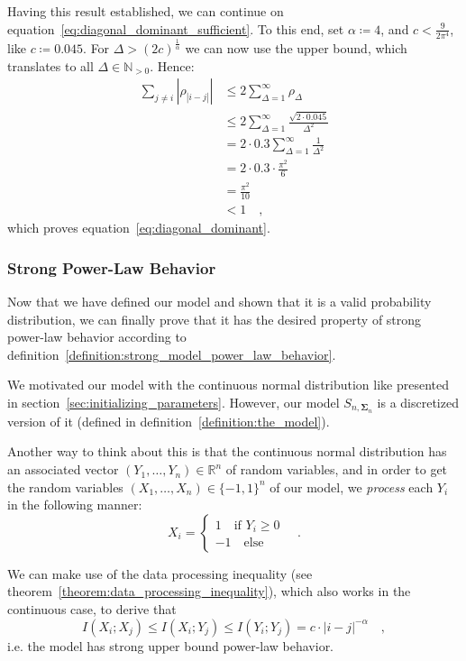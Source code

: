 \documentclass[../../main.tex]{subfiles}
\begin{document}
Having this result established, we can continue on equation~\eqref{eq:diagonal_dominant_sufficient}. To this end, set $\alpha \coloneqq 4$, and $c < \frac{9}{2 \pi^4}$, like $c \coloneqq 0.045$. For $\Delta > (2c)^{\frac{1}{\alpha}}$ we can now use the upper bound, which translates to all $\Delta \in \mathbb{N}_{>0}$. Hence:
\begin{align*}
    \sum_{j \neq i} |\rho_{|i-j|}| &\leq 2 \sum_{\Delta = 1}^{\infty} \rho_\Delta \\
    &\leq 2 \sum_{\Delta = 1}^{\infty} \frac{\sqrt{2 \cdot 0.045}}{\Delta^2} \\
    &= 2 \cdot 0.3 \sum_{\Delta = 1}^{\infty} \frac{1}{\Delta^2} \\
    &= 2 \cdot 0.3 \cdot \frac{\pi^2}{6} \\
    &= \frac{\pi^2}{10} \\
    &< 1 \quad ,
\end{align*}
which proves equation~\eqref{eq:diagonal_dominant}.

\subsubsection{Strong Power-Law Behavior}
Now that we have defined our model and shown that it is a valid probability distribution, we can finally prove that it has the desired property of strong power-law behavior according to definition~\ref{definition:strong_model_power_law_behavior}.

We motivated our model with the continuous normal distribution like presented in section~\ref{sec:initializing_parameters}. However, our model $S_{n, \bm{\Sigma}_n}$ is a discretized version of it (defined in definition~\ref{definition:the_model}). 

Another way to think about this is that the continuous normal distribution has an associated vector $(Y_1, \dots, Y_n) \in \mathbb{R}^n$ of random variables, and in order to get the random variables $(X_1, \dots, X_n) \in \{-1, 1\}^n$ of our model, we \emph{process} each $Y_i$ in the following manner:
\[
    X_i = \begin{cases}
        1 \quad \text{if } Y_i \geq 0 \\
        -1 \quad \text{else}
    \end{cases}
    \quad .
\]

We can make use of the data processing inequality (see theorem~\ref{theorem:data_processing_inequality}), which also works in the continuous case, to derive that
\[
    I(X_i; X_j) \leq I(X_i; Y_j) \leq I(Y_i; Y_j) = c \cdot |i - j|^{-\alpha}\quad ,
\]
i.e. the model has strong upper bound power-law behavior.
\end{document}
